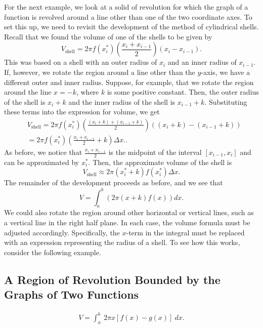 \documentclass{report}
\begin{document}
  \bigbreak \noindent 
  For the next example, we look at a solid of revolution for which the graph of a function is revolved around a line other than one of the two coordinate axes. To set this up, we need to revisit the development of the method of cylindrical shells. Recall that we found the volume of one of the shells to be given by
    \[
    V_{\text{shell}} = 2\pi f(x^*_i) \left( \frac{x_i + x_{i-1}}{2} \right) (x_i - x_{i-1}).
    \]
    This was based on a shell with an outer radius of \( x_i \) and an inner radius of \( x_{i-1} \). If, however, we rotate the region around a line other than the \( y \)-axis, we have a different outer and inner radius. Suppose, for example, that we rotate the region around the line \( x = -k \), where \( k \) is some positive constant. Then, the outer radius of the shell is \( x_i + k \) and the inner radius of the shell is \( x_{i-1} + k \). Substituting these terms into the expression for volume, we get
    \begin{align*}
        &V_{\text{shell}} = 2\pi f(x^*_i) \left( \frac{(x_i + k) + (x_{i-1} + k)}{2} \right) ((x_i + k) - (x_{i-1} + k))  \\
        &= 2\pi f(x^*_i) \left( \frac{x_i + x_{i-1}}{2} + k \right) \Delta x.
    .\end{align*}
    As before, we notice that \( \frac{x_i + x_{i-1}}{2} \) is the midpoint of the interval \( [x_{i-1}, x_i] \) and can be approximated by \( x^*_i \). Then, the approximate volume of the shell is
    \[
    V_{\text{shell}} \approx 2\pi (x^*_i + k) f(x^*_i) \Delta x.
    \]
    The remainder of the development proceeds as before, and we see that
    \[
    V = \int_{a}^{b} \left( 2\pi (x + k) f(x) \right) dx.
    \]
    We could also rotate the region around other horizontal or vertical lines, such as a vertical line in the right half plane. In each case, the volume formula must be adjusted accordingly. Specifically, the \( x \)-term in the integral must be replaced with an expression representing the radius of a shell. To see how this works, consider the following example.

    \pagebreak 
    \subsection*{A Region of Revolution Bounded by the Graphs of Two Functions}
    \bigbreak \noindent 
    \begin{thrm}
       \begin{align*}
           V = \int_{a}^{b}\ 2\pi x\left[f(x)-g(x)\right]\ dx
       .\end{align*} 
    \end{thrm}
\end{document}
